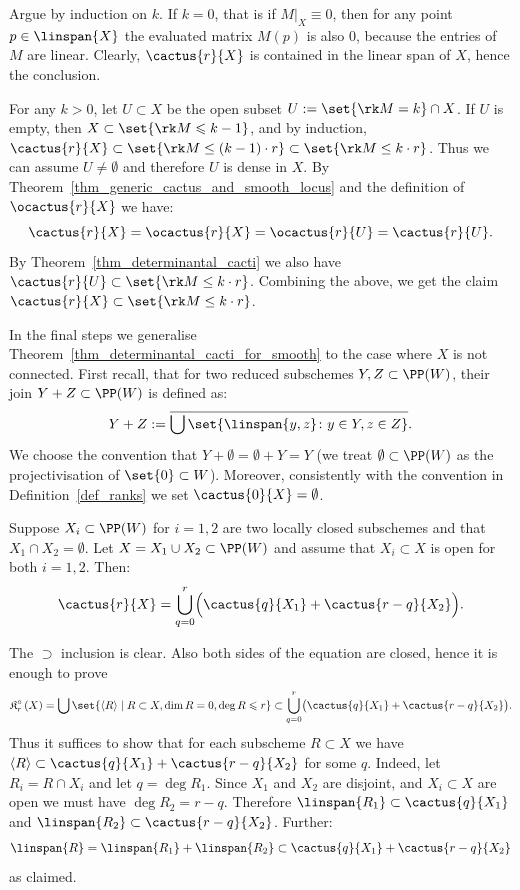 \documentclass[12pt,a4paper]{article}
\newcommand{\cactusop}[2]{\mathfrak{K}^{\circ}_{#1}\left( #2 \right)}
\begin{document}
\begin{prf}
  Argue by induction on $k$.
  If $k=0$, that is if $M|_X \equiv 0$,
    then for any point $p\in\linspan{X}$
    the evaluated matrix $M(p)$ is also $0$,
    because the entries of $M$ are linear.
  Clearly, $\cactus{r}{X}$ is contained in the linear span of $X$, hence the conclusion.

  For any $k>0$, let $U\subset X$ be the open subset
  $U:=\set{\rk M = k} \cap X$.
  If $U$ is empty,
    then $X\subset \set{\rk M \leqslant k-1}$,
    and by induction,
  $\cactus{r}{X}\subset \set{\rk M \le (k-1) \cdot r} \subset \set{\rk M \le k \cdot r}$.
  Thus we can assume $U\neq \emptyset$
  and therefore $U$ is dense in $X$.
  By Theorem~\ref{thm_generic_cactus_and_smooth_locus} and the definition of $\ocactus{r}{X}$ we have:
  \[
     \cactus{r}{X} = \ocactus{r}{X} = \ocactus{r}{U}
     = \cactus{r}{U}.
  \]
  By Theorem~\ref{thm_determinantal_cacti} we also have
  $\cactus{r}{U} \subset \set{\rk M \le k \cdot r}$.
  Combining the above, we get the claim $\cactus{r}{X} \subset \set{\rk M \le k \cdot r}$.
\end{prf}

In the final steps we generalise Theorem~\ref{thm_determinantal_cacti_for_smooth} to the case where $X$ is not connected.
First recall, that for two reduced subschemes $Y, Z\subset \PP(W)$,
their join $Y+Z\subset \PP(W)$ is defined as:
\[
 Y+Z := \overline{\bigcup\set{\linspan{y, z} \colon y\in Y, z\in Z}}.
\]
We choose the convention that $Y+\emptyset=\emptyset +Y =Y$
  (we treat $\emptyset\subset \PP (W)$
   as the projectivisation of $\set{0} \subset W$).
Moreover, consistently with the convention in Definition~\ref{def_ranks} we set $\cactus{0}{X}=\emptyset$.

\begin{lemma}
     \label{lem_cactus_as_join}
   Suppose $X_i\subset \PP(W)$ for $i=1, 2$
      are two locally closed subschemes
      and that $X_1\cap X_2 =\emptyset$.
   Let $X= X_1 \cup X_2 \subset \PP(W)$ and assume that $X_i \subset X$ is open for both $i=1, 2$.
   Then:
   \[
     \cactus{r}{X} = \bigcup_{q=0}^r  \Bigl(\cactus{q}{X_1}+\cactus{r-q}{X_2}\Bigr).
   \]
\end{lemma}

\begin{prf}
   The $\supset$ inclusion is clear.
   Also both sides of the equation are closed, hence it is enough to prove
   \[
    \cactusop{r}{X} =\bigcup \set{\langle R \rangle \mid
     R\subset X, \dim R = 0, \deg R \leqslant r} \subset \bigcup_{q=0}^r  \bigl(\cactus{q}{X_1}+\cactus{r-q}{X_2}\bigr).
   \]
   Thus it suffices to show that for each subscheme $R\subset X$
   we have $\langle R \rangle \subset \cactus{q}{X_1}+\cactus{r-q}{X_2}$ for some $q$.
   Indeed, let $R_i = R\cap X_i$ and let $q = \deg R_1$.
   Since $X_1$ and $X_2$ are disjoint, and $X_i\subset X$ are open we must have $\deg R_2= r-q$.
   Therefore $\linspan{R_1}\subset \cactus{q}{X_1}$
     and $\linspan{R_2}\subset \cactus{r-q}{X_2}$.
   Further:
   \[
      \linspan{R} = \linspan{R_1}+ \linspan{R_2} \subset \cactus{q}{X_1} + \cactus{r-q}{X_2}
   \]
   as claimed.
\end{prf}
\end{document}
